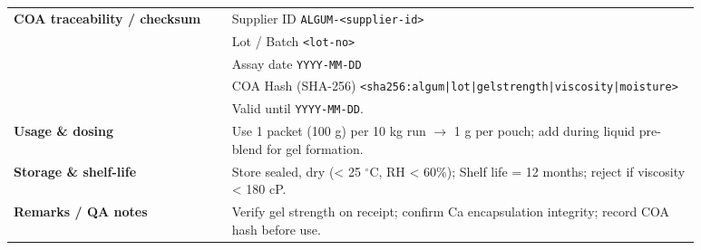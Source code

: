 \begin{adjustbox}{max width=\textwidth}
\begin{tabular}{@{}p{0.28\linewidth}p{0.60\linewidth}@{}}
\midrule
\textbf{COA traceability / checksum} &
Supplier ID \dotfill \texttt{ALGUM-<supplier-id>} \\
& Lot / Batch \dotfill \texttt{<lot-no>} \\
& Assay date \dotfill \texttt{YYYY-MM-DD} \\
& COA Hash (SHA-256) \dotfill \texttt{<sha256:algum|lot|gelstrength|viscosity|moisture>} \\
& Valid until \dotfill \texttt{YYYY-MM-DD}. \\

\midrule
\textbf{Usage \& dosing} &
Use 1 packet (100 g) per 10 kg run $\rightarrow$ 1 g per pouch; add during liquid pre-blend for gel formation. \\

\midrule
\textbf{Storage \& shelf-life} &
Store sealed, dry (< 25 $^\circ$C, RH < 60\%); Shelf life = 12 months; reject if viscosity < 180 cP. \\

\midrule
\textbf{Remarks / QA notes} &
Verify gel strength on receipt; confirm Ca encapsulation integrity; record COA hash before use. \\

\bottomrule
\end{tabular}\end{adjustbox}

\vspace{0.6em}

